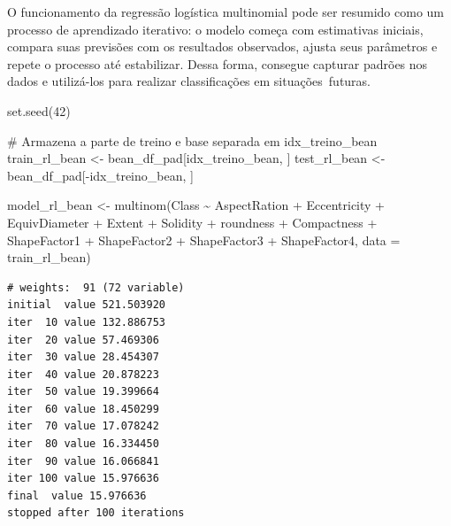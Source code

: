 \documentclass[
  letterpaper,
  DIV=11,
  numbers=noendperiod]{scrartcl}
\newenvironment{Shaded}{\begin{snugshade}}{\end{snugshade}}
\newcommand{\AttributeTok}[1]{\textcolor[rgb]{0.40,0.45,0.13}{#1}}
\newcommand{\CommentTok}[1]{\textcolor[rgb]{0.37,0.37,0.37}{#1}}
\newcommand{\DecValTok}[1]{\textcolor[rgb]{0.68,0.00,0.00}{#1}}
\newcommand{\FunctionTok}[1]{\textcolor[rgb]{0.28,0.35,0.67}{#1}}
\newcommand{\NormalTok}[1]{\textcolor[rgb]{0.00,0.23,0.31}{#1}}
\newcommand{\OtherTok}[1]{\textcolor[rgb]{0.00,0.23,0.31}{#1}}
\newcommand{\SpecialCharTok}[1]{\textcolor[rgb]{0.37,0.37,0.37}{#1}}
\begin{document}
O funcionamento da regressão logística multinomial pode ser resumido
como um processo de aprendizado iterativo: o modelo começa com
estimativas iniciais, compara suas previsões com os resultados
observados, ajusta seus parâmetros e repete o processo até estabilizar.
Dessa forma, consegue capturar padrões nos dados e utilizá-los para
realizar classificações em situações~futuras.

\begin{Shaded}
\begin{Highlighting}[]
\FunctionTok{set.seed}\NormalTok{(}\DecValTok{42}\NormalTok{)}

\CommentTok{\# Armazena a parte de treino e base separada em idx\_treino\_bean}
\NormalTok{train\_rl\_bean }\OtherTok{\textless{}{-}}\NormalTok{ bean\_df\_pad[idx\_treino\_bean, ]}
\NormalTok{test\_rl\_bean  }\OtherTok{\textless{}{-}}\NormalTok{ bean\_df\_pad[}\SpecialCharTok{{-}}\NormalTok{idx\_treino\_bean, ]}


\NormalTok{model\_rl\_bean }\OtherTok{\textless{}{-}} \FunctionTok{multinom}\NormalTok{(Class }\SpecialCharTok{\textasciitilde{}}\NormalTok{ AspectRation }\SpecialCharTok{+}\NormalTok{ Eccentricity }\SpecialCharTok{+}\NormalTok{ EquivDiameter }\SpecialCharTok{+}\NormalTok{ Extent }\SpecialCharTok{+}\NormalTok{ Solidity }\SpecialCharTok{+}\NormalTok{ roundness }\SpecialCharTok{+}\NormalTok{ Compactness }\SpecialCharTok{+}\NormalTok{ ShapeFactor1 }\SpecialCharTok{+}\NormalTok{ ShapeFactor2 }\SpecialCharTok{+}\NormalTok{ ShapeFactor3 }\SpecialCharTok{+}\NormalTok{ ShapeFactor4, }\AttributeTok{data =}\NormalTok{ train\_rl\_bean)}
\end{Highlighting}
\end{Shaded}

\begin{verbatim}
# weights:  91 (72 variable)
initial  value 521.503920 
iter  10 value 132.886753
iter  20 value 57.469306
iter  30 value 28.454307
iter  40 value 20.878223
iter  50 value 19.399664
iter  60 value 18.450299
iter  70 value 17.078242
iter  80 value 16.334450
iter  90 value 16.066841
iter 100 value 15.976636
final  value 15.976636 
stopped after 100 iterations
\end{verbatim}

\begin{Shaded}
\end{Shaded}
\end{document}
